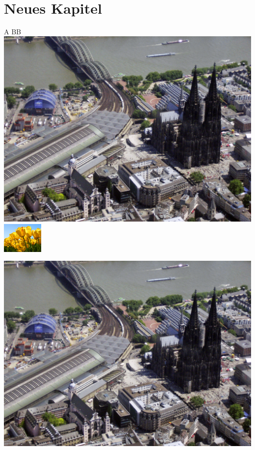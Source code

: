 \documentclass[
    fontsize=11pt,%
    paper=a4,%
    headings=small,
    parskip=half,
    listof=totoc,
    bibliography=totoc,
    pagesize
]{scrbook}
\theoremstyle{break}
\theoremstyle{plain}
\begin{document}
\cite{Mittelbach.2004}

\hspace*{\fill}
\\

\chapter{Neues Kapitel}
\blindtext

A B\hfill B\\
\newlength{\myheight}
\includegraphics[height=\myheight]{Abbildungen/Koeln_RdFlug_1}
\includegraphics[width=2cm]{Abbildungen/Tulips}

\addtolength{\myheight}{3cm}
\includegraphics[height=\myheight]{Abbildungen/Koeln_RdFlug_1}

\nocite{*}
\printbibliography[nottype=online]
\printbibliography[type=online]
\end{document}

